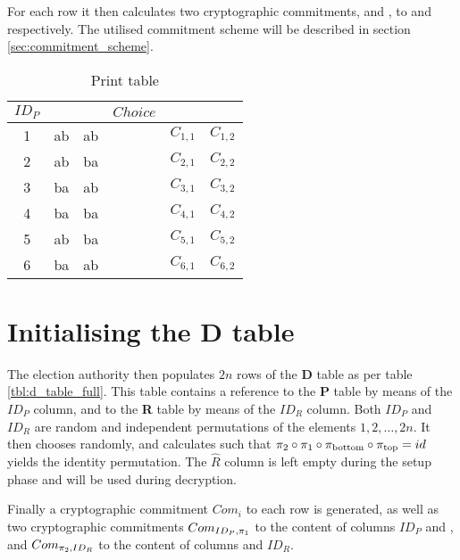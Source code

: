 For each row it then calculates two cryptographic commitments, \ctop{} and
\cbottom{}, to \ptop{} and \pbottom{} respectively. The utilised commitment
scheme will be described in section \ref{sec:commitment_scheme}.

\begin{table}
	\centering
	\begin{tabular}{|c|c|c|c|c|c|}
		\hline
		$ID_P$ & \ptop & \pbottom & $Choice$ & \ctop & \cbottom \\
		\hline
		1 & ab & ab & & $C_{1, 1}$ & $C_{1, 2}$ \\
		2 & ab & ba & & $C_{2, 1}$ & $C_{2, 2}$ \\
		3 & ba & ab & & $C_{3, 1}$ & $C_{3, 2}$ \\
		4 & ba & ba & & $C_{4, 1}$ & $C_{4, 2}$ \\
		5 & ab & ba & & $C_{5, 1}$ & $C_{5, 2}$ \\
		6 & ba & ab & & $C_{6, 1}$ & $C_{6, 2}$ \\
		\hline
	\end{tabular}
	\caption{Print table}
	\label{tbl:p_table_full}
\end{table}

\section{Initialising the \textbf{D} table}

The election authority then populates $2n$ rows of the \textbf{D} table as per
table \ref{tbl:d_table_full}. This table contains a reference to the \textbf{P}
table by means of the $ID_P$ column, and to the \textbf{R} table by means of
the $ID_R$ column. Both $ID_P$ and $ID_R$ are random and independent
permutations of the elements $1, 2, \ldots, 2n$. It then chooses \pone{}
randomly, and calculates \ptwo{} such that $\pi_2 \circ \pi_1 \circ \pi_{\text{bottom}}
\circ \pi_{\text{top}} = id$ yields the identity permutation.  The $\hat{R}$ column is
left empty during the setup phase and will be used during decryption. 

Finally a  cryptographic commitment $Com_i$ to each row is generated, as well
as two cryptographic commitments $Com_{ID_P, \pi_1}$ to the content of columns
$ID_P$ and \pone{}, and $Com_{\pi_2, ID_R}$ to the content of columns \ptwo{}
and $ID_R$.

